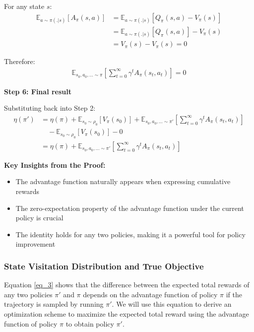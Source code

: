 For any state $s$:
\begin{align}
\mathbb{E}_{a \sim \pi(.|s)}[A_\pi(s,a)] &= \mathbb{E}_{a \sim \pi(.|s)}[Q_\pi(s,a) - V_\pi(s)] \\
&= \mathbb{E}_{a \sim \pi(.|s)}[Q_\pi(s,a)] - V_\pi(s) \\
&= V_\pi(s) - V_\pi(s) = 0
\end{align}

Therefore:
\begin{align}
\mathbb{E}_{s_0, a_0, \ldots \sim \pi} \left[ \sum_{t = 0}^{\infty} \gamma^t A_\pi(s_t, a_t) \right] = 0
\end{align}

\textbf{Step 6: Final result}

Substituting back into Step 2:
\begin{align}
\eta(\pi') &= \eta(\pi) + \mathbb{E}_{s_0 \sim \rho_0} [V_\pi(s_0)] + \mathbb{E}_{s_0, a_0, \ldots \sim \pi'} \left[ \sum_{t = 0}^{\infty} \gamma^t A_\pi(s_t, a_t) \right] \\
&\quad - \mathbb{E}_{s_0 \sim \rho_0} [V_\pi(s_0)] - 0 \\
&= \eta(\pi) + \mathbb{E}_{s_0, a_0, \ldots \sim \pi'} \left[ \sum_{t = 0}^{\infty} \gamma^t A_\pi(s_t, a_t) \right]
\end{align}

\textbf{Key Insights from the Proof:}
\begin{itemize}
    \item The advantage function naturally appears when expressing cumulative rewards
    \item The zero-expectation property of the advantage function under the current policy is crucial
    \item The identity holds for any two policies, making it a powerful tool for policy improvement
\end{itemize}

\subsubsection{State Visitation Distribution and True Objective}

Equation \ref{eq_3} shows that the difference between the expected total rewards of any two policies $\pi'$ and $\pi$ depends on the advantage function of policy $\pi$ if the trajectory is sampled by running $\pi'$. We will use this equation to derive an optimization scheme to maximize the expected total reward using the advantage function of policy $\pi$ to obtain policy $\pi'$.


